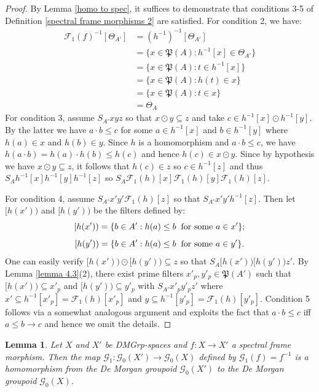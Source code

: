 \documentclass{amsart}
\theoremstyle{plain}
\newtheorem{lemma}[theorem]{Lemma}
\theoremstyle{definition}
\begin{document}
\begin{proof}
    By Lemma \ref{homo to spec}, it suffices to demonstrate that conditions 3-5 of Definition \ref{spectral frame morphisms 2} are satisfied. For condition 2, we have:
    \begin{align*}
        \mathcal{F}_1(f)^{-1}[\Theta_{A'}]&=(h^{-1})^{-1}[\Theta_{A'}]
        \\&=\{x\in\mathfrak{P}(A):h^{-1}[x]\in\Theta_{A'}\}
        \\&=\{x\in\mathfrak{P}(A):t\in h^{-1}[x]\}
        \\&=\{x\in\mathfrak{P}(A):h(t)\in x\}
        \\&=\{x\in\mathfrak{P}(A):t\in x\}
        \\&=\Theta_A
    \end{align*}  
    For condition 3, assume $S_{A'}xyz$ so that $x\odot y\subseteq z$ and take $c\in h^{-1}[x]\odot h^{-1}[y]$. By the latter we have $a\cdot b\leq c$ for some $a\in h^{-1}[x]$ and $b\in h^{-1}[y]$ where $h(a)\in x$ and $h(b)\in y$. Since $h$ is a homomorphism and $a\cdot b\leq c$, we have $h(a\cdot b)=h(a)\cdot h(b)\leq h(c)$ and hence $h(c)\in x\odot y$. Since by hypothesis we have $x\odot y\subseteq z$, it follows that $h(c)\in z$ so $c\in h^{-1}[z]$ and thus $S_Ah^{-1}[x]h^{-1}[y]h^{-1}[z]$ so $S_A\mathcal{F}_1(h)[x]\mathcal{F}_1(h)[y]\mathcal{F}_1(h)[z]$.  

    For condition 4, assume $S_{A'}x'y'\mathcal{F}_1(h)[z]$ so that $S_{A'}x'y'h^{-1}[z]$. Then let $[h(x'))$ and $[h(y'))$ be the filters defined by: 
    \[[h(x'))=\{b\in A':h(a)\leq b\hspace{.2cm}\text{for some $a\in x'$}\};\]
     \[[h(y'))=\{b\in A':h(a)\leq b\hspace{.2cm}\text{for some $a\in y'$}\}.\]
     One can easily verify $[h(x'))\odot[h(y'))\subseteq z$ so that  $S_A[h(x'))[h(y'))z'$. By Lemma \ref{lemma 4.3}(2), there exist prime filters $x'_p,y'_p\in\mathfrak{P}(A')$ such that $[h(x'))\subseteq x'_p$ and $[h(y'))\subseteq y'_p$ with $S_{A'}x'_py'_pz'$ where $x'\subseteq h^{-1}[x'_p]=\mathcal{F}_1(h)[x'_p]$ and $y\subseteq h^{-1}[y'_p]=\mathcal{F}_1(h)[y'_p]$. Condition 5 follows via a somewhat analogous argument and exploits the fact that $a\cdot b\leq c$ iff $a\leq b\rightarrow c$ and hence we omit the details.    
\end{proof}
\begin{lemma}\label{lemma 4.21}
  Let $X$ and $X'$ be DMGrp-spaces and $f\colon X\to X'$ a spectral frame morphism. Then the map $\mathcal{G}_1\colon\mathcal{G}_0(X')\to\mathcal{G}_0(X)$ defined by $\mathcal{G}_1(f)=f^{-1}$ is a homomorphism from the De Morgan groupoid $\mathcal{G}_0(X')$ to the De Morgan groupoid $\mathcal{G}_0(X)$.     
\end{lemma}
\end{document}
